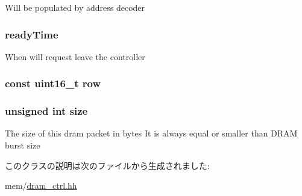 \label{classDRAMCtrl_1_1DRAMPacket_aa939c368630feb349e132c957bf16cc8}
Will be populated by address decoder \hypertarget{classDRAMCtrl_1_1DRAMPacket_a7cb362ebfb8750bd53baf5e8f96e00d0}{
\subsubsection[{readyTime}]{ {\bf readyTime}}}
\label{classDRAMCtrl_1_1DRAMPacket_a7cb362ebfb8750bd53baf5e8f96e00d0}
When will request leave the controller \hypertarget{classDRAMCtrl_1_1DRAMPacket_a48cff24d2110d967f3f47db949e329e0}{
\subsubsection[{row}]{\setlength{\rightskip}{0pt plus 5cm}const uint16\_\-t {\bf row}}}
\label{classDRAMCtrl_1_1DRAMPacket_a48cff24d2110d967f3f47db949e329e0}
\hypertarget{classDRAMCtrl_1_1DRAMPacket_aac913b3a1f6ef005d66bf7a84428773e}{
\subsubsection[{size}]{\setlength{\rightskip}{0pt plus 5cm}unsigned int {\bf size}}}
\label{classDRAMCtrl_1_1DRAMPacket_aac913b3a1f6ef005d66bf7a84428773e}
The size of this dram packet in bytes It is always equal or smaller than DRAM burst size 

このクラスの説明は次のファイルから生成されました:\begin{DoxyCompactItemize}
\item 
mem/\hyperlink{dram__ctrl_8hh}{dram\_\-ctrl.hh}\end{DoxyCompactItemize}
